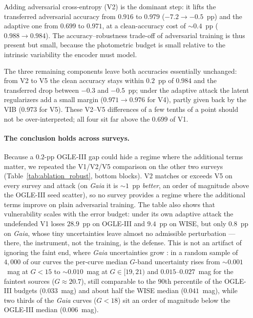 \documentclass{aa}
\begin{document}
Adding adversarial cross-entropy (V2) is the dominant step: it lifts the
transferred adversarial accuracy from $0.916$ to $0.979$ ($-7.2 \to
-0.5$~pp) and the adaptive one from $0.699$ to $0.971$, at a clean-accuracy
cost of ${\sim}0.4$~pp ($0.988 \to 0.984$). The accuracy--robustness
trade-off of adversarial training \citep{zhang2019theoretically} is thus
present but small, because the photometric budget is small relative to the
intrinsic variability the encoder must model.

The three remaining
components leave both accuracies essentially unchanged: from V2 to V5 the
clean accuracy stays within $0.2$~pp of $0.984$ and the transferred drop
between $-0.3$ and $-0.5$~pp; under the adaptive attack the latent
regularizers add a small margin ($0.971 \to 0.976$ for V4), partly given
back by the VIB ($0.973$ for V5). These V2--V5 differences of a few tenths
of a point should not be over-interpreted; all four sit far above the
$0.699$ of V1.
\paragraph{The conclusion holds across surveys.}
Because a $0.2$-pp OGLE-III gap could hide a regime where the additional terms matter, we repeated the V1/V2/V5 comparison on the other two surveys (Table~\ref{tab:ablation_robust}, bottom blocks). V2 matches or exceeds V5 on every survey and attack (on \textit{Gaia} it is ${\sim}1$~pp \emph{better}, an order of magnitude above the OGLE-III seed scatter), so no survey provides a regime where the additional terms improve on plain adversarial training. The table also shows that vulnerability scales with the error budget: under its own adaptive attack the undefended V1 loses $28.9$~pp on OGLE-III and $9.4$~pp on WISE, but only $0.8$~pp on \textit{Gaia}, whose tiny uncertainties leave almost no admissible perturbation --- there, the instrument, not the training, is the defense. This is not an artifact of ignoring the faint end, where \textit{Gaia} uncertainties grow \citep[e.g., Fig.~14 of][]{rimoldini2019gaia}: in a random sample of $4{,}000$ of our curves the per-curve median $G$-band uncertainty rises from ${\sim}0.001$~mag at $G < 15$ to ${\sim}0.010$~mag at $G \in [19, 21)$ and $0.015$--$0.027$~mag for the faintest sources ($G \approx 20.7$), still comparable to the $90$th percentile of the OGLE-III budgets ($0.033$~mag) and about half the WISE median ($0.041$~mag), while two thirds of the \textit{Gaia} curves ($G < 18$) sit an order of magnitude below the OGLE-III median ($0.006$~mag).
\end{document}
